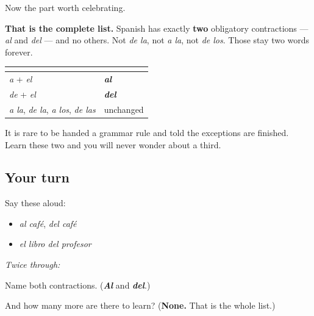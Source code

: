 \begin{culture}
Now the part worth celebrating.

\textbf{That is the complete list.} Spanish has exactly \textbf{two} obligatory contractions — \emph{al} and \emph{del} — and no others. Not \emph{de la}, not \emph{a la}, not \emph{de los}. Those stay two words forever.

\noindent
\begin{tabularx}{\linewidth}{@{}>{\raggedright\arraybackslash}X>{\raggedright\arraybackslash}X@{}}
\toprule
\textbf{} & \textbf{} \\
\midrule
\emph{a} + \emph{el} & \emph{\textbf{al}} \\
\emph{de} + \emph{el} & \emph{\textbf{del}} \\
\emph{a la}, \emph{de la}, \emph{a los}, \emph{de las} & unchanged \\
\bottomrule
\end{tabularx}

It is rare to be handed a grammar rule and told the exceptions are finished. Learn these two and you will never wonder about a third.
\end{culture}

\subsection*{Your turn}
Say these aloud:

\begin{itemize}
\raggedright
  \item \emph{al café}, \emph{del café}
  \item \emph{el libro del profesor}
\end{itemize}

\emph{Twice through:}

\begin{tcolorbox}[breakable,colback=teal!4,colframe=teal!35!black,title={Before you move on}]
Name both contractions. (\emph{\textbf{Al}} and \emph{\textbf{del}}.)

And how many more are there to learn? (\textbf{None.} That is the whole list.)
\end{tcolorbox}

